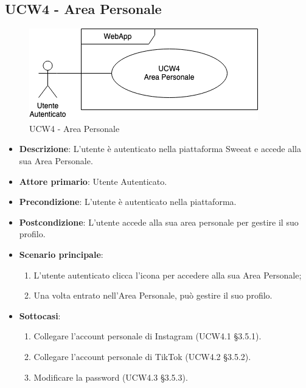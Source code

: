 \subsection{UCW4 - Area Personale}
\begin{figure}[!h]
\centering
\includegraphics[scale=0.5]{UC_images/UCW4.png}
\caption{UCW4 - Area Personale}
\end{figure}
\begin{itemize}
\item \textbf{Descrizione}: L'utente è autenticato nella piattaforma Sweeat e accede alla sua Area Personale.
\item \textbf{Attore primario}: Utente Autenticato.
\item \textbf{Precondizione}: L'utente è autenticato nella piattaforma.
\item \textbf{Postcondizione}: L'utente accede alla sua area personale per gestire il suo profilo.

\item \textbf{Scenario principale}:
\begin{enumerate}
\item L'utente autenticato clicca l'icona per accedere alla sua Area Personale;
\item Una volta entrato nell'Area Personale, può gestire il suo profilo.
\end{enumerate}

\item \textbf{Sottocasi}:
\begin{enumerate}
	\item Collegare l'account personale di Instagram (UCW4.1 \S 3.5.1).
	\item Collegare l'account personale di TikTok (UCW4.2 \S 3.5.2).
	\item Modificare la password (UCW4.3 \S 3.5.3). 
\end{enumerate}
\end{itemize}
